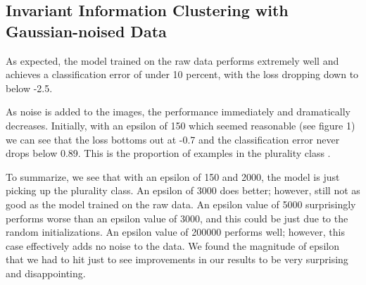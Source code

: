 \documentclass[12pt]{report}
\begin{document}
\subsection{Invariant Information Clustering with Gaussian-noised Data}
As expected, the model trained on the raw data performs extremely well and achieves a classification error of under 10 percent, with the loss dropping down to below -2.5.

As noise is added to the images, the performance immediately and dramatically decreases. Initially, with an epsilon of 150 which seemed reasonable (see figure 1) we can see that the loss bottoms out at -0.7 and the classification error never drops below 0.89. This is the proportion of examples in the plurality class .

To summarize, we see that with an epsilon of 150 and 2000, the model is just picking up the plurality class. An epsilon of 3000 does better; however, still not as good as the model trained on the raw data. An epsilon value of 5000 surprisingly performs worse than an epsilon value of 3000, and this could be just due to the random initializations. An epsilon value of 200000 performs well; however, this case effectively adds no noise to the data. We found the magnitude of epsilon that we had to hit just to see improvements in our results to be very surprising and disappointing. 
\end{document}
